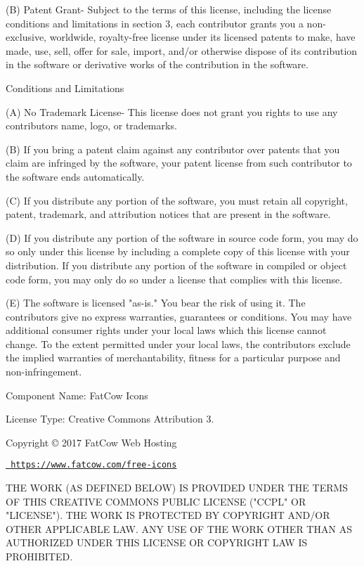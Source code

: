 (B) Patent Grant-\/ Subject to the terms of this license, including the license conditions and limitations in section 3, each contributor grants you a non-\/exclusive, worldwide, royalty-\/free license under its licensed patents to make, have made, use, sell, offer for sale, import, and/or otherwise dispose of its contribution in the software or derivative works of the contribution in the software.


\begin{DoxyEnumerate}
\item Conditions and Limitations
\end{DoxyEnumerate}

(A) No Trademark License-\/ This license does not grant you rights to use any contributors\textquotesingle{} name, logo, or trademarks.

(B) If you bring a patent claim against any contributor over patents that you claim are infringed by the software, your patent license from such contributor to the software ends automatically.

(C) If you distribute any portion of the software, you must retain all copyright, patent, trademark, and attribution notices that are present in the software.

(D) If you distribute any portion of the software in source code form, you may do so only under this license by including a complete copy of this license with your distribution. If you distribute any portion of the software in compiled or object code form, you may only do so under a license that complies with this license.

(E) The software is licensed "{}as-\/is."{} You bear the risk of using it. The contributors give no express warranties, guarantees or conditions. You may have additional consumer rights under your local laws which this license cannot change. To the extent permitted under your local laws, the contributors exclude the implied warranties of merchantability, fitness for a particular purpose and non-\/infringement.

 Component Name\+: Fat\+Cow Icons

License Type\+: Creative Commons Attribution 3.

Copyright © 2017 Fat\+Cow Web Hosting

\href{https://www.fatcow.com/free-icons}{\texttt{ https\+://www.\+fatcow.\+com/free-\/icons}}

THE WORK (AS DEFINED BELOW) IS PROVIDED UNDER THE TERMS OF THIS CREATIVE COMMONS PUBLIC LICENSE ("{}\+CCPL"{} OR "{}\+LICENSE"{}). THE WORK IS PROTECTED BY COPYRIGHT AND/\+OR OTHER APPLICABLE LAW. ANY USE OF THE WORK OTHER THAN AS AUTHORIZED UNDER THIS LICENSE OR COPYRIGHT LAW IS PROHIBITED.


